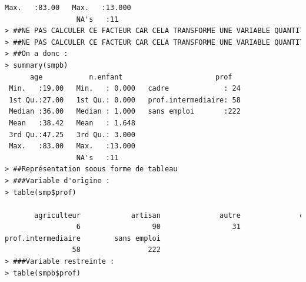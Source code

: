 \begin{lstlisting}[language=html]
 Max.   :83.00   Max.   :13.000                           
                 NA's   :11                               
> ##NE PAS CALCULER CE FACTEUR CAR CELA TRANSFORME UNE VARIABLE QUANTITATIVE EN VARIABLE QUALITATIVEsmpb$age <- factor(smpb$age)
> ##NE PAS CALCULER CE FACTEUR CAR CELA TRANSFORME UNE VARIABLE QUANTITATIVE EN VARIABLE QUALITATIVE smpb$n.enfant <- factor(smpb$n.enfant)
> ##On a donc :
> summary(smpb)
      age           n.enfant                      prof    
 Min.   :19.00   Min.   : 0.000   cadre             : 24  
 1st Qu.:27.00   1st Qu.: 0.000   prof.intermediaire: 58  
 Median :36.00   Median : 1.000   sans emploi       :222  
 Mean   :38.42   Mean   : 1.648                           
 3rd Qu.:47.25   3rd Qu.: 3.000                           
 Max.   :83.00   Max.   :13.000                           
                 NA's   :11                               
> ##Représentation soous forme de tableau
> ###Variable d'origine :
> table(smp$prof)

       agriculteur            artisan              autre              cadre            employe            ouvrier 
                 6                 90                 31                 24                135                227 
prof.intermediaire        sans emploi 
                58                222 
> ###Variable restreinte :
> table(smpb$prof)


\end{lstlisting}
